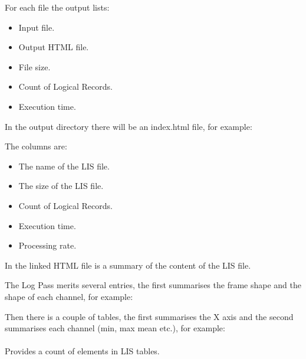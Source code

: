 \documentclass[letterpaper,10pt,english]{sphinxmanual}
\begin{document}
For each file the output lists:
\begin{itemize}
\item {} 
Input file.

\item {} 
Output HTML file.

\item {} 
File size.

\item {} 
Count of Logical Records.

\item {} 
Execution time.

\end{itemize}

In the output directory there will be an index.html file, for example:

\noindent{}

The columns are:
\begin{itemize}
\item {} 
The name of the LIS file.

\item {} 
The size of the LIS file.

\item {} 
Count of Logical Records.

\item {} 
Execution time.

\item {} 
Processing rate.

\end{itemize}

In the linked HTML file is a summary of the content of the LIS file.

The Log Pass merits several entries, the first summarises the frame shape and the shape of each channel, for example:

\noindent{}

Then there is a couple of tables, the first summarises the X axis and the second summarises each channel (min, max mean etc.), for example:

\noindent{}


\paragraph{}
\label{\detokenize{cmd_line_tools/LIS_cmd_line_tools:tdlistablehistogram}}
Provides a count of elements in LIS tables.
\end{document}
